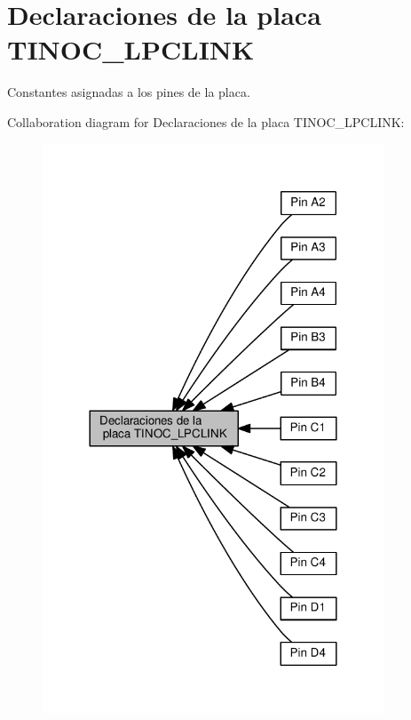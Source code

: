 \hypertarget{group___d_e_f_i_n_e_l_p_l_i_n_k}{}\section{Declaraciones de la placa T\+I\+N\+O\+C\+\_\+\+L\+P\+C\+L\+I\+NK}
\label{group___d_e_f_i_n_e_l_p_l_i_n_k}


Constantes asignadas a los pines de la placa.  


Collaboration diagram for Declaraciones de la placa T\+I\+N\+O\+C\+\_\+\+L\+P\+C\+L\+I\+NK\+:\nopagebreak
\begin{figure}[H]
\begin{center}
\leavevmode
\includegraphics[width=288pt]{group___d_e_f_i_n_e_l_p_l_i_n_k}
\end{center}
\end{figure}
